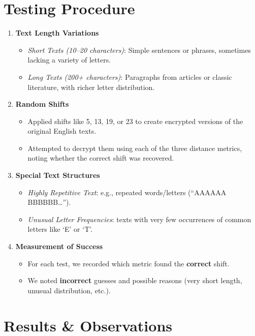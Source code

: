 \documentclass[11pt]{article}
\begin{document}
\section{Testing Procedure}
\begin{enumerate}
\item \textbf{Text Length Variations}
  \begin{itemize}
  \item \emph{Short Texts (10--20 characters)}: Simple sentences or phrases, sometimes lacking a variety of letters.
  \item \emph{Long Texts (200+ characters)}: Paragraphs from articles or classic literature, with richer letter distribution.
  \end{itemize}
\item \textbf{Random Shifts}
  \begin{itemize}
  \item Applied shifts like 5, 13, 19, or 23 to create encrypted versions of the original English texts.
  \item Attempted to decrypt them using each of the three distance metrics, noting whether the correct shift was recovered.
  \end{itemize}
\item \textbf{Special Text Structures}
  \begin{itemize}
  \item \emph{Highly Repetitive Text}: e.g., repeated words/letters (``AAAAAA BBBBBB\dots'').
  \item \emph{Unusual Letter Frequencies}: texts with very few occurrences of common letters like `E' or `T'.
  \end{itemize}
\item \textbf{Measurement of Success}
  \begin{itemize}
  \item For each test, we recorded which metric found the \textbf{correct} shift.
  \item We noted \textbf{incorrect} guesses and possible reasons (very short length, unusual distribution, etc.).
  \end{itemize}
\end{enumerate}

\section{Results \& Observations}
\end{document}
